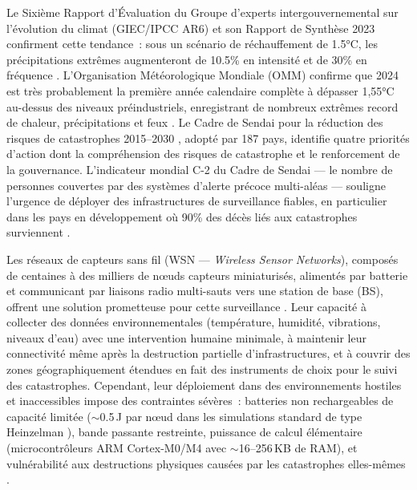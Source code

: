 Le Sixième Rapport d'Évaluation du Groupe d'experts intergouvernemental sur l'évolution du climat (GIEC/IPCC AR6) et son Rapport de Synthèse 2023 confirment cette tendance~: sous un scénario de réchauffement de 1.5°C, les précipitations extrêmes augmenteront de 10.5\% en intensité et de 30\% en fréquence \cite{IPCC2021AR6,IPCC2023SYR}. L'Organisation Météorologique Mondiale (OMM) confirme que 2024 est très probablement la première année calendaire complète à dépasser 1{,}55°C au-dessus des niveaux préindustriels, enregistrant de nombreux extrêmes record de chaleur, précipitations et feux \cite{wmo2025climate}. Le Cadre de Sendai pour la réduction des risques de catastrophes 2015--2030 \cite{UNDRR2015Sendai}, adopté par 187 pays, identifie quatre priorités d'action dont la compréhension des risques de catastrophe et le renforcement de la gouvernance. L'indicateur mondial C-2 du Cadre de Sendai --- le nombre de personnes couvertes par des systèmes d'alerte précoce multi-aléas --- souligne l'urgence de déployer des infrastructures de surveillance fiables, en particulier dans les pays en développement où 90\% des décès liés aux catastrophes surviennent \cite{wmo2025climate}.

Les réseaux de capteurs sans fil (WSN --- \emph{Wireless Sensor Networks}), composés de centaines à des milliers de n\oe{}uds capteurs miniaturisés, alimentés par batterie et communicant par liaisons radio multi-sauts vers une station de base (BS), offrent une solution prometteuse pour cette surveillance \cite{al_qundus_wireless_2020}. Leur capacité à collecter des données environnementales (température, humidité, vibrations, niveaux d'eau) avec une intervention humaine minimale, à maintenir leur connectivité même après la destruction partielle d'infrastructures, et à couvrir des zones géographiquement étendues en fait des instruments de choix pour le suivi des catastrophes. Cependant, leur déploiement dans des environnements hostiles et inaccessibles impose des contraintes sévères~: batteries non rechargeables de capacité limitée ($\sim$0.5\,J par n\oe{}ud dans les simulations standard de type Heinzelman \cite{heinzelman2000leach}), bande passante restreinte, puissance de calcul élémentaire (microcontrôleurs ARM Cortex-M0/M4 avec $\sim$16--256\,KB de RAM), et vulnérabilité aux destructions physiques causées par les catastrophes elles-mêmes \cite{yarali_wireless_2020}.


